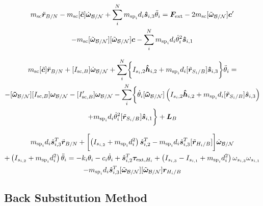 \begin{multline}
m_{\text{sc}} \ddot{\bm r}_{B/N}-m_{\text{sc}} [\tilde{\bm{c}}]\dot{\bm\omega}_{\cal B/N}+\sum_{i}^{N}m_{\text{sp}_i} d_i  \bm{\hat{s}}_{i,3}\ddot{\theta}_i = \bm F_{\textnormal{ext}} - 2 m_{\text{sc}} [\tilde{\bm\omega}_{\cal B/N}]\bm{c}'\\
-m_{\text{sc}} [\tilde{\bm\omega}_{\cal B/N}][\tilde{\bm\omega}_{\cal B/N}]\bm{c}-\sum_{i}^{N}m_{\text{sp}_i}d_i\dot{\theta}_i^2 \bm{\hat{s}}_{i,1}
\label{eq:Rbddot3}
\end{multline}

\begin{multline}
	m_{\text{sc}}[\tilde{\bm{c}}]\ddot{\bm r}_{B/N}+[I_{\text{sc},B}] \dot{\bm\omega}_{\cal B/N} +\sum\limits_{i}^{N}\biggl\lbrace I_{s_i,2}\bm{\hat{h}}_{i,2}+m_{\text{sp}_i}d_i [\tilde{\bm{r}}_{S_i/B}] \bm{\hat{s}}_{i,3}\biggr\rbrace\ddot{\theta}_i = \\
	-[\bm{\tilde{\omega}}_{\cal B/N}] [I_{\text{sc},B}] \bm\omega_{\cal B/N} 
	- [I'_{\text{sc},B}] \bm\omega_{\cal B/N} - \sum\limits_{i}^{N}\biggl\lbrace\dot{\theta}_i [\bm{\tilde{\omega}}_{\cal B/N}] \left(I_{s_i,2} \bm{\hat{h}}_{i,2}+m_{\text{sp}_i} d_i [\tilde{\bm{r}}_{S_i/B}] \hat{\bm s}_{i,3}\right)\\ +m_{\text{sp}_i}d_i\dot{\theta}_i^2[\tilde{\bm{r}}_{S_i/B}] \bm{\hat{s}}_{i,1} \biggr\rbrace + \bm{L}_B
	\label{eq:Final6}
\end{multline}

\begin{multline}
m_{\text{sp}_i} d_i \hat{\bm s}_{i,3}^{T} \ddot{\bm r}_{B/N}+ \biggl[\left(I_{s_{i,2}} + m_{\text{sp}_i}d_i^{2}\right) \hat{\bm s}_{i,2}^{T}-m_{\text{sp}_i} d_i \hat{\bm s}_{i,3}^{T} [\tilde{\bm r}_{H_i/B}]\biggr] \dot{\bm\omega}_{\cal B/N} \\
+ \left( I_{s_{i,2}} + m_{\text{sp}_i} d_i^{2} \right) \ddot \theta_i 
= - k_i \theta_i - c_i \dot\theta_i + \hat{\bm s}_{i,2}^T \bm \tau_{\text{ext},H_i} + \left( I_{s_{i,3}} - I_{s_{i,1}} + m_{\text{sp}_i}d_i^{2}\right) \omega_{s_{i,3}} \omega_{s_{i,1}}\\
- m_{\text{sp}_i} d_i \hat{\bm s}_{i,3}^{T} [\tilde{\bm\omega}_{\cal B/N}][\tilde{\bm\omega}_{\cal B/N}] \bm r_{H_i/B} 
\label{eq:solar_panel_final3}
\end{multline}

\subsection{Back Substitution Method}

